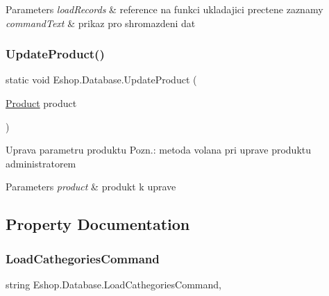 \begin{DoxyParams}{Parameters}
{\em load\+Records} & reference na funkci ukladajici prectene zaznamy\\
\hline
{\em command\+Text} & prikaz pro shromazdeni dat\\
\hline
\end{DoxyParams}
\mbox{\label{class_eshop_1_1_database_a2f2575d8ac2a4bb07c782a19497663da}} 
\subsubsection{\texorpdfstring{UpdateProduct()}{UpdateProduct()}}
{\footnotesize\ttfamily static void Eshop.\+Database.\+Update\+Product (\begin{DoxyParamCaption}\item[{\mbox{\hyperlink{class_eshop_1_1_product}{Product}}}]{product }\end{DoxyParamCaption})\hspace{0.3cm}{\ttfamily [static]}}



Uprava parametru produktu Pozn.\+: metoda volana pri uprave produktu administratorem 


\begin{DoxyParams}{Parameters}
{\em product} & produkt k uprave\\
\hline
\end{DoxyParams}


\subsection{Property Documentation}
\mbox{\label{class_eshop_1_1_database_ad90033e47ea802c51c2e0a2013a4e54e}} 
\subsubsection{\texorpdfstring{LoadCathegoriesCommand}{LoadCathegoriesCommand}}
{\footnotesize\ttfamily string Eshop.\+Database.\+Load\+Cathegories\+Command\hspace{0.3cm}{\ttfamily [static]}, {\ttfamily [get]}}

